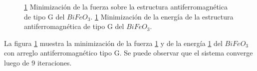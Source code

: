 \begin{figure}[H]
    \centering
    \singlespace
    \caption[Minimizaci\'on de la fuerza y la energ\'ia del $BiFeO_{3}$ con 
    arreglo antiferromagn\'etico tipo 
    G]{\ref{minimizacion_bfo_G}  Minimizaci\'on de la 
        fuerza sobre la estructura antiferromagn\'etica de tipo G del 
        $BiFeO_{3}$. 
        \ref{minimizacion_bfo_G}  Minimizaci\'on de la 
        energ\'ia de la estructura antiferromagn\'etica de tipo G del 
        $BiFeO_{3}$.}
    \label{minimizacion_bfo_G}
\end{figure}

\noindent La figura \ref{minimizacion_bfo_G} muestra la minimizaci\'on de la 
fuerza \ref{minimizacion_bfo_G}  y de la energ\'ia 
\ref{minimizacion_bfo_G}  del $BiFeO_{3}$ con arreglo 
antiferromagn\'etico tipo G. Se puede observar que el sistema converge luego de 
9 iteraciones.

